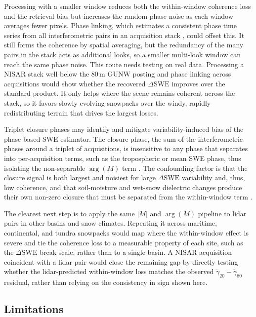 \documentclass[tc, manuscript]{copernicus}
\begin{document}
Processing with a smaller window reduces both the within-window coherence loss and the retrieval bias but increases the random phase noise as each window averages fewer pixels. Phase linking, which estimates a consistent phase time series from all interferometric pairs in an acquisition stack \citep{Guarnieri2008, ansari2017sequential-aff, eppler2022adapting-c4d, zwieback2022cheap-026}, could offset this. It still forms the coherence by spatial averaging, but the redundancy of the many pairs in the stack acts as additional looks, so a smaller multi-look window can reach the same phase noise. This route needs testing on real data. Processing a NISAR stack well below the 80\,\unit{m} GUNW posting and phase linking across acquisitions would show whether the recovered $\Delta\mathrm{SWE}$ improves over the standard product. It only helps where the scene remains coherent across the stack, so it favors slowly evolving snowpacks over the windy, rapidly redistributing terrain that drives the largest losses.

Triplet closure phases may identify and mitigate variability-induced bias of the phase-based SWE estimator. The closure phase, the sum of the interferometric phases around a triplet of acquisitions, is insensitive to any phase that separates into per-acquisition terms, such as the tropospheric or mean SWE phase, thus isolating the non-separable $\arg(M)$ term \citep{zwieback2024temporal-426}. The confounding factor is that the closure signal is both largest and noisiest for large $\Delta\mathrm{SWE}$ variability and, thus, low coherence, and that soil-moisture and wet-snow dielectric changes produce their own non-zero closure that must be separated from the within-window term \citep{Zan2014, zwieback2016statistical-d35}.

The clearest next step is to apply the same $|M|$ and $\arg(M)$ pipeline to lidar pairs in other basins and snow climates. Repeating it across maritime, continental, and tundra snowpacks would map where the within-window effect is severe and tie the coherence loss to a measurable property of each site, such as the $\Delta\mathrm{SWE}$ break scale, rather than to a single basin. A NISAR acquisition coincident with a lidar pair would close the remaining gap by directly testing whether the lidar-predicted within-window loss matches the observed $\tilde{\gamma}_{20}-\tilde{\gamma}_{80}$ residual, rather than relying on the consistency in sign shown here.

\subsection{Limitations}\label{subsec:limitations}
\end{document}
